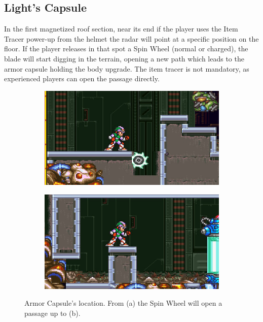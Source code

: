 \subsection{Light's Capsule}\label{X2:Body_parts}
In the first magnetized roof section, near its end if the player uses the Item Tracer power-up from the helmet the radar will point at a specific position on the floor. If the player releases in that spot a Spin Wheel (normal or charged), the blade will start digging in the terrain, opening a new path which leads to the armor capsule holding the body upgrade. The item tracer is not mandatory, as experienced players can open the passage directly.
\begin{figure}[htp]
	\centering
	\begin{subfigure}{0.4\linewidth}
		\centering
		\includegraphics[width=\linewidth]{figures/X2/Morph_moth/Moth_capsule_1.jpg}	
		\caption{}
	\end{subfigure}
	\begin{subfigure}{0.4\linewidth}
		\centering
		\includegraphics[width=\linewidth]{figures/X2/Morph_moth/Moth_capsule_2.jpg}
		\caption{}	
	\end{subfigure}
	\caption{Armor Capsule's location. From (a) the Spin Wheel will open a passage up to (b).}
\end{figure}



